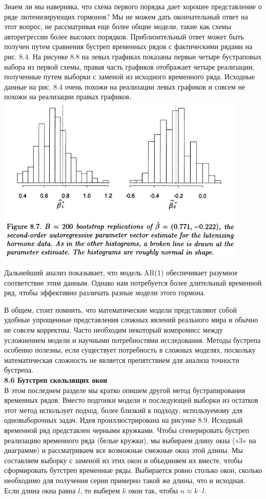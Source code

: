 \documentclass{report}
\begin{document}
Знаем ли мы наверняка, что схема первого порядка дает хорошее представление о ряде лютенизирующих гормонов? Мы не можем дать окончательный ответ на этот вопрос, не рассматривая еще более общие модели, такие как схемы авторегрессии более высоких порядков. Приблизительный ответ может быть получен путем сравнения бустреп временных рядов с фактическими рядами на рис. 8.4. На рисунке 8.8 на левых графиках показаны первые четыре бустраповых набора из первой схемы, правая часть графиков отображает четыре реализации, полученные путем выборки с заменой из исходного временного ряда. Исходные данные на рис. 8.4 очень похожи на реализации левых графиков и совсем не похожи на реализации правых графиков.\\
\includegraphics[width=12cm]{fig87}

Дальнейший анализ показывает, что модель AR(1) обеспечивает разумное соответствие этим данным. Однако нам потребуется более длительный временной ряд, чтобы эффективно различать разные модели этого гормона.

В общем, стоит помнить, что математические модели представляют собой удобные упрощенные представления сложных явлений реального мира и обычно не совсем корректны. Часто необходим некоторый компромисс между усложнением модели и научными потребностями исследования. Методы бустрепа особенно полезны, если существует потребность в сложных моделях, поскольку математическая сложность не является препятствием для анализа точности бустрепа.\\
\textbf{8.6 Бутстреп скользящих окон}\\
В этом последнем разделе мы кратко опишем другой метод бустрапирования временных рядов. Вместо подгонки модели и последующей выборки из остатков этот метод использует подход, более близкий к подходу, используемому для одновыборочных задач. Идея проиллюстрирована на рисунке 8.9. Исходный временной ряд представлен черными кружками. Чтобы сгенерировать бустреп реализацию временного ряда (белые кружки), мы выбираем длину окна («$3$» на диаграмме) и рассматриваем все возможные смежные окна этой длины. Мы составляем выборку с заменой из этих окон и объединяем их вместе, чтобы сформировать бутстреп временные ряды. Выбирается ровно столько окон, сколько необходимо для получения серии примерно такой же длины, что и исходная. Если длина окна равна $l$, то выберем $k$ окон так, чтобы $n \approx k \cdot l$.
\end{document}
